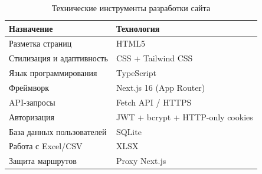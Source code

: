 \begin{table}[H]
\caption{\label{tab:techInst}Технические инструменты разработки сайта}
\begin{small}
\begin{center}
\begin{tabular}{|l|l|}
\hline
Назначение & Технология \\ \hline
Разметка страниц & HTML5 \\ \hline
Стилизация и адаптивность & CSS + Tailwind CSS \\ \hline
Язык программирования & TypeScript \\ \hline
Фреймворк & Next.js 16 (App Router) \\ \hline
API-запросы & Fetch API / HTTPS \\ \hline
Авторизация & JWT + bcrypt + HTTP-only cookies \\ \hline
База данных пользователей & SQLite \\ \hline
Работа с Excel/CSV & XLSX \\ \hline
Защита маршрутов & Proxy Next.js \\ \hline
\end{tabular}
\end{center}
\end{small}
\end{table}
